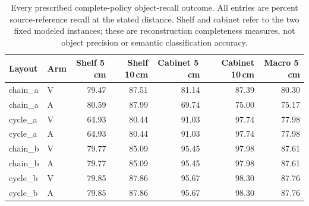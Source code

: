 \begin{table}[t]
\centering
\caption{Every prescribed complete-policy object-recall outcome. All entries are percent source-reference recall at the stated distance. Shelf and cabinet refer to the two fixed modeled instances; these are reconstruction completeness measures, not object precision or semantic classification accuracy.}
\small\setlength{\tabcolsep}{4pt}
\begin{tabular}{llrrrrr}
\toprule
Layout & Arm & Shelf 5\,cm & Shelf 10\,cm & Cabinet 5\,cm & Cabinet 10\,cm & Macro 5\,cm \\
\midrule
chain\_a & V & 79.47 & 87.51 & 81.14 & 87.39 & 80.30 \\
chain\_a & A & 80.59 & 87.99 & 69.74 & 75.00 & 75.17 \\
cycle\_a & V & 64.93 & 80.44 & 91.03 & 97.74 & 77.98 \\
cycle\_a & A & 64.93 & 80.44 & 91.03 & 97.74 & 77.98 \\
chain\_b & V & 79.77 & 85.09 & 95.45 & 97.98 & 87.61 \\
chain\_b & A & 79.77 & 85.09 & 95.45 & 97.98 & 87.61 \\
cycle\_b & V & 79.85 & 87.86 & 95.67 & 98.30 & 87.76 \\
cycle\_b & A & 79.85 & 87.86 & 95.67 & 98.30 & 87.76 \\
\bottomrule
\end{tabular}
\end{table}
